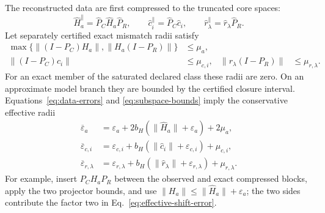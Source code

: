 \documentclass[aps,prl,reprint,superscriptaddress,nofootinbib]{revtex4-2}
\newcommand{\eps}{\varepsilon}
\begin{document}
The reconstructed data are first compressed to the truncated core spaces:
\begin{equation}
 \widehat H_a^{\parallel}=\widehat P_C\widehat H_a\widehat P_R,
 \qquad
 \widehat c_i^{\parallel}=\widehat P_C\widehat c_i,
 \qquad
 \widehat r_\lambda^{\parallel}=\widehat r_\lambda\widehat P_R.
 \label{eq:compressed-data}
\end{equation}
Let separately certified exact mismatch radii satisfy
\begin{align}
 \max\{\|(I-P_C)H_a\|,\|H_a(I-P_R)\|\}&\le\mu_a,\nonumber\\
 \|(I-P_C)c_i\|&\le\mu_{c,i},&
 \|r_\lambda(I-P_R)\|&\le\mu_{r,\lambda}.
 \label{eq:model-mismatch-radii}
\end{align}
For an exact member of the saturated declared class these radii are zero.  On an approximate model branch they are bounded by the certified closure interval.  Equations~\eqref{eq:data-errors} and \eqref{eq:subspace-bounds} imply the conservative effective radii
\begin{align}
 \overline\eps_a
 &=\eps_a+2b_H(\|\widehat H_a\|+\eps_a)+2\mu_a,
 \label{eq:effective-shift-error}\\
 \overline\eps_{c,i}
 &=\eps_{c,i}+b_H(\|\widehat c_i\|+\eps_{c,i})+\mu_{c,i},
 \label{eq:effective-seed-error}\\
 \overline\eps_{r,\lambda}
 &=\eps_{r,\lambda}+b_H(\|\widehat r_\lambda\|+\eps_{r,\lambda})+\mu_{r,\lambda}.
 \label{eq:effective-readout-error}
\end{align}
For example, insert $P_CH_aP_R$ between the observed and exact compressed blocks, apply the two projector bounds, and use
$\|H_a\|\le\|\widehat H_a\|+\eps_a$; the two sides contribute the factor two in Eq.~\eqref{eq:effective-shift-error}.
\end{document}
